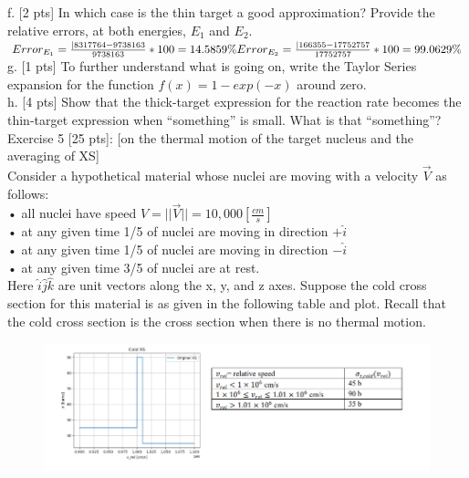 \documentclass[12pt,fleqn, parskip=full]{scrartcl}
\begin{document}
f. [2 pts] In which case is the thin target a good approximation? Provide the relative errors, at both energies, $E_1$ and $E_2$.\\
$Error_{E_1} = \frac{|8317764 - 9738163}{9738163}*100 = 14.5859\%\\
Error_{E_2} = \frac{|166355 - 17752757}{17752757}*100 = 99.0629\% $ \\

g. [1 pts] To further understand what is going on, write the Taylor Series expansion for the function   $f(x) = 1 - exp(-x)$ around zero.\\


h. [4 pts] Show that the thick-target expression for the reaction rate becomes the thin-target expression when “something” is small. What is that “something”?\\

Exercise 5 [25 pts]: [on the thermal motion of the target nucleus and the averaging of XS]\\
Consider a hypothetical material whose nuclei are moving with a velocity $\overrightarrow{V}$ as follows:\\
• all nuclei have speed $ V = ||\overrightarrow{V}|| = 10,000 [\frac{cm}{s}]$\\
• at any given time 1/5 of nuclei are moving in direction $+\hat{i}$\\
• at any given time 1/5 of nuclei are moving in direction $-\hat{i}$\\
• at any given time 3/5 of nuclei are at rest.\\
 Here $\hat{i} \hat{j} \hat{k}$ are unit vectors along the x, y, and z axes. Suppose the cold cross section for this material is as given in the following table and plot. Recall that the cold cross section is the cross section when there is no thermal motion.\\

\begin{figure}[H]
	\centering
	\includegraphics[scale=.7]{Image_1_hw_1}
\end{figure}
\end{document}
